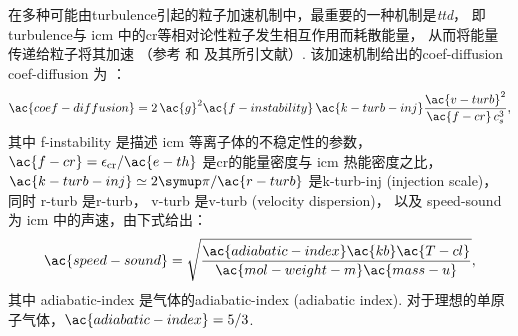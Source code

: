 在多种可能由\ac{turbulence}引起的粒子加速机制中，最重要的一种机制是\emph{\acf{ttd}}，
即\ac{turbulence}与 \ac{icm} 中的\ac{cr}等相对论性粒子发生相互作用而耗散能量，
从而将能量传递给粒子将其加速
（参考  和  及其所引文献）.
该加速机制给出的\acl{coef-diffusion} \ac{coef-diffusion} 为
\cite{miniati2015,pinzke2017}：
\begin{equation}
  \ac{coef-diffusion}
    = 2\,\ac{g}^2 \ac{f-instability} \,\ac{k-turb-inj}
      \frac{\ac{v-turb}^2}{\ac{f-cr} \,c_s^3} ,
\end{equation}
其中
\ac{f-instability} 是描述 \ac{icm} 等离子体的不稳定性的参数，
$\ac{f-cr} = \epsilon_{\R{cr}} / \ac{e-th}$
是\ac{cr}的能量密度与 \ac{icm} 热能密度之比，
$\ac{k-turb-inj} \simeq 2\Cpi / \ac{r-turb}$
是\acl{k-turb-inj} (injection scale)，
同时 \ac{r-turb} 是\acl{r-turb}，
\ac{v-turb} 是\acl{v-turb} (velocity dispersion)，
以及 \ac{speed-sound} 为 \ac{icm} 中的声速，由下式给出：
\begin{equation}
  \ac{speed-sound}
    = \sqrt{\frac{\ac{adiabatic-index} \ac{kb} \ac{T-cl}}{
        \ac{mol-weight-m} \ac{mass-u}}} ,
\end{equation}
其中 \ac{adiabatic-index} 是气体的\acl{adiabatic-index} (adiabatic index).
对于理想的单原子气体，$\ac{adiabatic-index} = 5/3$.

